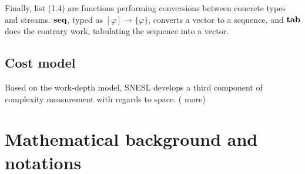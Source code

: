 Finally, list (1.4) are functions performing conversions between concrete types and streams. $\mathbf{seq}$, typed as $[\varphi] \rightarrow \{\varphi\}$, converts a vector to a sequence, and $\mathbf{tab}$ does the contrary work, tabulating the sequence into a vector.



\subsection{Cost model}
Based on the work-depth model, SNESL develops a third component of complexity measurement with regards to space.
(%
more)

\section{Mathematical background and notations}
%	
%
